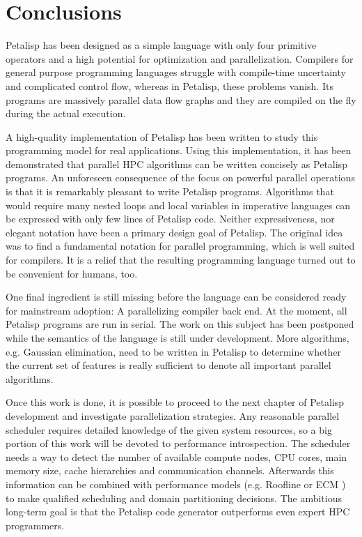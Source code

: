 \section{Conclusions}
\label{sec:conclusions}

Petalisp has been designed as a simple language with only four primitive
operators and a high potential for optimization and
parallelization. Compilers for general purpose programming languages
struggle with compile-time uncertainty and complicated control flow,
whereas in Petalisp, these problems vanish. Its programs are massively
parallel data flow graphs and they are compiled on the fly during the
actual execution.

A high-quality implementation of Petalisp has been written to study this
programming model for real applications. Using this implementation, it has
been demonstrated that parallel HPC algorithms can be written concisely as
Petalisp programs. An unforeseen consequence of the focus on powerful
parallel operations is that it is remarkably pleasant to write Petalisp
programs. Algorithms that would require many nested loops and local
variables in imperative languages can be expressed with only few lines of
Petalisp code. Neither expressiveness, nor elegant notation have been a
primary design goal of Petalisp. The original idea was to find a
fundamental notation for parallel programming, which is well suited for
compilers. It is a relief that the resulting programming language turned
out to be convenient for humans, too.

One final ingredient is still missing before the language can be considered
ready for mainstream adoption: A parallelizing compiler back end. At the
moment, all Petalisp programs are run in serial. The work on this subject
has been postponed while the semantics of the language is still under
development. More algorithms, e.g. Gaussian elimination, need to be written
in Petalisp to determine whether the current set of features is really
sufficient to denote all important parallel algorithms.

Once this work is done, it is possible to proceed to the next chapter of
Petalisp development and investigate parallelization strategies. Any
reasonable parallel scheduler requires detailed knowledge of the given
system resources, so a big portion of this work will be devoted to
performance introspection. The scheduler needs a way to detect the number
of available compute nodes, CPU cores, main memory size, cache hierarchies
and communication channels. Afterwards this information can be combined
with performance models (e.g. Roofline \cite{roofline} or ECM \cite{ecm})
to make qualified scheduling and domain partitioning decisions. The
ambitious long-term goal is that the Petalisp code generator outperforms
even expert HPC programmers.
